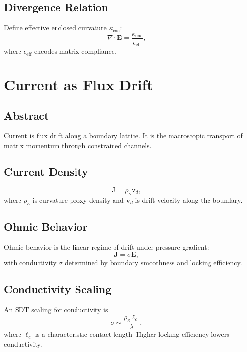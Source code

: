 \documentclass[12pt]{book}
\begin{document}
\section{Divergence Relation}
Define effective enclosed curvature $\kappa_{\text{enc}}$:
\begin{equation}
\nabla \cdot \mathbf{E} = \frac{\kappa_{\text{enc}}}{\epsilon_{\text{eff}}},
\end{equation}
where $\epsilon_{\text{eff}}$ encodes matrix compliance.

\chapter{Current as Flux Drift}

\section*{Abstract}
Current is flux drift along a boundary lattice. It is the macroscopic transport of matrix momentum
through constrained channels.

\section{Current Density}
\begin{equation}
\mathbf{J} = \rho_{\kappa} \mathbf{v}_d,
\end{equation}
where $\rho_{\kappa}$ is curvature proxy density and $\mathbf{v}_d$ is drift velocity along the boundary.

\section{Ohmic Behavior}
Ohmic behavior is the linear regime of drift under pressure gradient:
\begin{equation}
\mathbf{J} = \sigma \mathbf{E},
\end{equation}
with conductivity $\sigma$ determined by boundary smoothness and locking efficiency.

\section{Conductivity Scaling}
An SDT scaling for conductivity is
\begin{equation}
\sigma \sim \frac{\rho_{\kappa} \ell_c}{\lambda},
\end{equation}
where $\ell_c$ is a characteristic contact length. Higher locking efficiency lowers conductivity.
\end{document}
